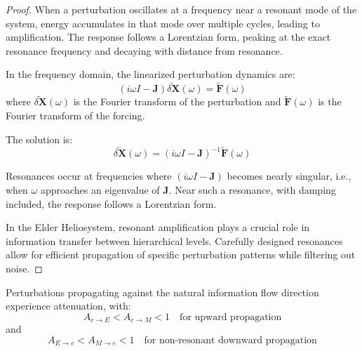 \begin{proof}
When a perturbation oscillates at a frequency near a resonant mode of the system, energy accumulates in that mode over multiple cycles, leading to amplification. The response follows a Lorentzian form, peaking at the exact resonance frequency and decaying with distance from resonance.

In the frequency domain, the linearized perturbation dynamics are:
\begin{equation}
(i\omega I - \mathbf{J}) \tilde{\delta\mathbf{X}}(\omega) = \tilde{\mathbf{F}}(\omega)
\end{equation}
where $\tilde{\delta\mathbf{X}}(\omega)$ is the Fourier transform of the perturbation and $\tilde{\mathbf{F}}(\omega)$ is the Fourier transform of the forcing.

The solution is:
\begin{equation}
\tilde{\delta\mathbf{X}}(\omega) = (i\omega I - \mathbf{J})^{-1} \tilde{\mathbf{F}}(\omega)
\end{equation}

Resonances occur at frequencies where $(i\omega I - \mathbf{J})$ becomes nearly singular, i.e., when $\omega$ approaches an eigenvalue of $\mathbf{J}$. Near such a resonance, with damping included, the response follows a Lorentzian form.

In the Elder Heliosystem, resonant amplification plays a crucial role in information transfer between hierarchical levels. Carefully designed resonances allow for efficient propagation of specific perturbation patterns while filtering out noise.
\end{proof}

\begin{theorem}
Perturbations propagating against the natural information flow direction experience attenuation, with:
\begin{equation}
A_{e \to E} < A_{e \to M} < 1 \quad \text{for upward propagation}
\end{equation}
and
\begin{equation}
A_{E \to e} < A_{M \to e} < 1 \quad \text{for non-resonant downward propagation}
\end{equation}
\end{theorem}

